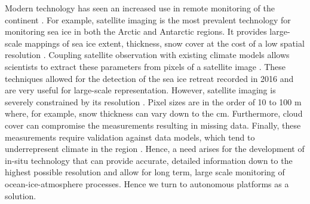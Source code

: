 
Modern technology has seen an increased use in remote monitoring of the continent \cite{kennicutt2016delivering}. For example, satellite imaging is the most prevalent technology for monitoring sea ice in both the Arctic and Antarctic regions. It provides large-scale mappings of sea ice extent, thickness, snow cover at  the cost of a low spatial resolution \cite{turner2017unprecedented,galin2011validation,alberello2019drift}. Coupling satellite observation with existing climate models allows scientists to extract these parameters from pixels of a satellite image \cite{galin2011validation}. These techniques allowed for the detection of the sea ice retreat recorded in 2016 \cite{turner2017unprecedented} and are very useful for large-scale representation. However, satellite imaging is severely constrained by its resolution \cite{emery1997satellite}. Pixel sizes are in the order of 10 to 100 m \cite{galin2011validation} where, for example, snow thickness can vary down to the cm. Furthermore, cloud cover can compromise the measurements resulting in missing data. Finally, these measurements require validation against data models, which tend to underrepresent climate in the region \cite{galin2011validation,emery1997satellite}. Hence, a need arises for the development of in-situ technology that can provide accurate, detailed information down to the highest possible resolution and allow for long term, large scale monitoring of ocean-ice-atmosphere processes. Hence we turn to autonomous platforms as a solution.\par 
